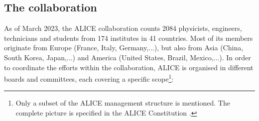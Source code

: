\subsection{The collaboration}

As of March 2023, the ALICE collaboration counts 2084 physicists, engineers, technicians and students from 174 institutes in 41 countries. Most of its members originate from Europe (France, Italy, Germany,...), but also from Asia (China, South Korea, Japan,...) and America (United States, Brazil, Mexico,...). In order to coordinate the efforts within the collaboration, ALICE is organised in different boards and committees, each covering a specific scope\footnote{Only a subset of the ALICE management structure is mentioned. The complete picture is specified in the ALICE Constitution \cite{alicecollaborationALICECollaboration}.}:

